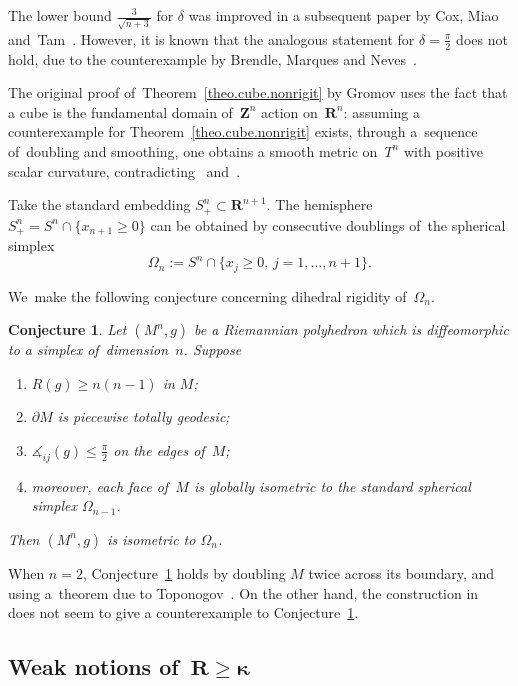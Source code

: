 \documentclass[pdftex]{sigma}
\numberwithin{equation}{section}
\newtheorem{conj}[prop]{Conjecture}
\theoremstyle{definition}
\newcommand{\RR}{\mathbf{R}}
\newcommand{\ZZ}{\mathbf{Z}}
\begin{document}
The lower bound $\frac{3}{\sqrt{n+3}}$ for $\delta$ was improved in a subsequent paper by Cox, Miao and~Tam~\cite{CoxMiaoTam2013remarks}. However, it is known that the analogous statement for $\delta=\frac{\pi}{2}$ does not hold, due to the counterexample by Brendle, Marques and Neves~\cite{Brendle2011deformation}.

The original proof of~Theorem~\ref{theo.cube.nonrigit} by Gromov uses the fact that a cube is the fundamental domain of~$\ZZ^n$ action on~$\RR^n$: assuming a counterexample for Theorem~\ref{theo.cube.nonrigit} exists, through a~sequence of~doubling and smoothing, one obtains a smooth metric on~$T^n$ with positive scalar curvature, contradicting~\cite{GromovLawson1980Spin} and~\cite{SchoenYau1979structure}.

Take the standard embedding $S^n_+\subset\RR^{n+1}$. The hemisphere $S^n_+=S^n\cap \{x_{n+1}\ge 0\}$ can be obtained by consecutive doublings of~the spherical simplex\vspace{-.5ex}
\[
\Omega_n:=S^n\cap \{x_j\ge 0,\, j=1,\dots,n+1\}.
\]

We~make the following conjecture concerning dihedral rigidity of~$\Omega_n$.

\begin{conj}\label{conj.spherical.simplex}
Let $(M^n,g)$ be a Riemannian polyhedron which is diffeomorphic to a simplex of~dimension~$n$. Suppose\vspace{-.5ex}
\begin{enumerate}\itemsep=0pt
\item[${\rm 1)}$] $R(g)\ge n(n-1)$ in $M$;
\item[${\rm 2)}$] $\partial M$ is piecewise totally geodesic;
\item[${\rm 3)}$] $\measuredangle_{ij}(g)\le \frac{\pi}{2}$ on the edges of~$M$;
\item[${\rm 4)}$] moreover, each face of~$M$ is globally isometric to the standard spherical simplex $\Omega_{n-1}$.
\end{enumerate}
Then $(M^n,g)$ is isometric to $\Omega_n$.
\end{conj}

When $n=2$, Conjecture~\ref{conj.spherical.simplex} holds by doubling $M$ twice across its boundary, and using a~theorem due to Toponogov~\cite{Toponogov1959evaluation}. On the other hand, the construction in~\cite{Brendle2011deformation} does not seem to give a counterexample to Conjecture~\ref{conj.spherical.simplex}.

\subsection[Weak notions of $R \ge \kappa$]{Weak notions of~$\boldsymbol{R\ge \kappa}$}
\end{document}
